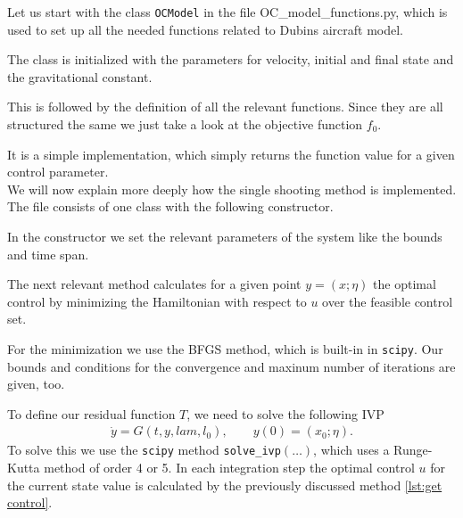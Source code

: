 \documentclass[a4paper]{article}
\theoremstyle{definitions}
\theoremstyle{bemerkung}
\theoremstyle{satz}
\theoremstyle{satz}
\newcommand{\code}[1]{\colorbox{backcolour}{\texttt{#1}}}
\begin{document}
Let us start with the class \code{OCModel} in the file OC\_model\_functions.py, which is used to set up all the needed functions related to Dubins aircraft model.

The class is initialized with the parameters for velocity, initial and final state and the gravitational constant.



This is followed by the definition of all the relevant functions. Since they are all structured the same we just take a look at the objective function $f_0$. 





It is a simple implementation, which simply returns the function value for a given control parameter.\\

We will now explain more deeply how the single shooting method is implemented. The file consists of one class with the following constructor.



In the constructor we set the relevant parameters of the system like the bounds and time span.

The next relevant method calculates for a given point $y = (x; \eta)$ the optimal control by minimizing the Hamiltonian with respect to $u$ over the feasible control set.



For the minimization we use the BFGS method, which is built-in in \code{scipy}. Our bounds and conditions for the convergence and maxinum number of iterations are given, too.

To define our residual function $T$, we need to solve the following IVP
\begin{align*}
\dot{y} = G(t,y, lam, l_0), \qquad y(0) = (x_0; \eta).
\end{align*}
To solve this we use the \code{scipy} method \code{solve\_ivp$(\dots)$}, which uses a Runge-Kutta method of order 4 or 5. In each integration step the optimal control $u$ for the current state value is calculated by the previously discussed method \ref{lst:get control}.
\end{document}
